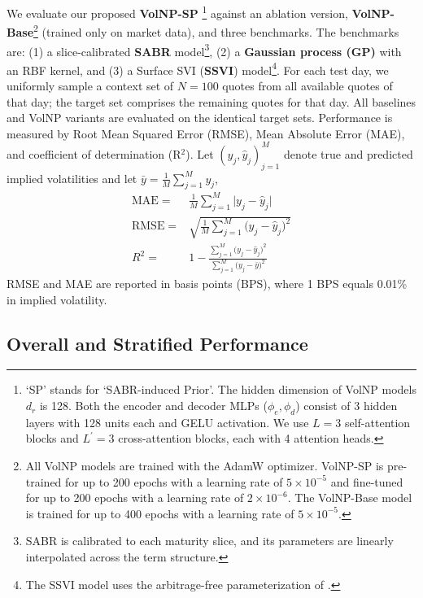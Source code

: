 \documentclass[authoryear,preprint,review,12pt]{elsarticle}
\begin{document}
We evaluate our proposed \textbf{VolNP-SP} \footnote{`SP' stands for `SABR-induced Prior'. The hidden dimension of VolNP models \(d_r\) is 128. Both the encoder and decoder MLPs (\(\phi_e, \phi_d\)) consist of 3 hidden layers with 128 units each and GELU activation. We use \(L=3\) self-attention blocks and \(L^\prime=3\) cross-attention blocks, each with 4 attention heads.} against an ablation version, \textbf{VolNP-Base}\footnote{All VolNP models are trained with the AdamW optimizer. VolNP-SP is pre-trained for up to 200 epochs with a learning rate of \(5 \times 10^{-5}\) and fine-tuned for up to 200 epochs with a learning rate of \(2 \times 10^{-6}\). The VolNP-Base model is trained for up to 400 epochs with a learning rate of \(5 \times 10^{-5}\).} (trained only on market data), and three benchmarks. The benchmarks are: (1) a slice-calibrated \textbf{SABR} model\footnote{SABR is calibrated to each maturity slice, and its parameters are linearly interpolated across the term structure.}, (2) a \textbf{Gaussian process (GP)} with an RBF kernel, and (3) a Surface SVI (\textbf{SSVI}) model\footnote{The SSVI model uses the arbitrage-free parameterization of \citet{gatheral2014arbitrage}. }.  For each test day, we uniformly sample a context set of \(N=100\) quotes from all available quotes of that day; the target set comprises the remaining quotes for that day. All baselines and VolNP variants are evaluated on the identical target sets. Performance is measured by Root Mean Squared Error (RMSE), Mean Absolute Error (MAE), and coefficient of determination (R$^2$). Let $(y_j, \hat y_j)_{j=1}^M$ denote true and predicted implied volatilities and let $\bar y = \tfrac{1}{M}\sum_{j=1}^M y_j$,
\begin{align*}
    \mathrm{MAE} =& \frac{1}{M} \sum_{j=1}^M \big| y_j - \hat y_j \big|\\
    \mathrm{RMSE} =& \sqrt{\frac{1}{M} \sum_{j=1}^M \big( y_j - \hat y_j \big)^2}\\
    R^2 =& 1 - \frac{\sum_{j=1}^M \big( y_j - \hat y_j \big)^2}{\sum_{j=1}^M \big( y_j - \bar y \big)^2}
\end{align*}
RMSE and MAE are reported in basis points (BPS), where 1 BPS equals 0.01\% in implied volatility.

\subsection{Overall and Stratified Performance}
\label{sec:performance}
\end{document}
